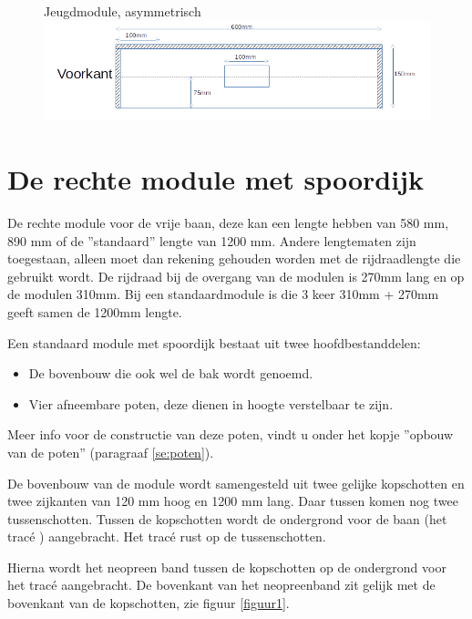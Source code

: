 \documentclass[12pt,a4paper]{report}
\newcommand*{\trace}{trac\'{e} }
\begin{document}
\begin{figure}[!ht]
  \captionbox
  {Jeugdmodule, asymmetrisch\label{im:jeugdbak}}
  {\includegraphics[scale=0.9]{images/jeugdbak}}
\end{figure}

\section{De rechte module met spoordijk}
De rechte module voor de vrije baan, deze kan een lengte hebben van 580 mm, 890 mm of de ''standaard'' lengte van 1200 mm.
Andere lengtematen zijn toegestaan, alleen moet dan rekening gehouden worden met de rijdraadlengte die gebruikt wordt. De rijdraad bij de overgang van de modulen is 270mm lang en op de modulen 310mm.
Bij een standaardmodule is die 3 keer 310mm + 270mm geeft samen de 1200mm lengte.

Een standaard module met spoordijk bestaat uit twee hoofdbestanddelen:
\begin{itemize}
\item De bovenbouw die ook wel de bak wordt genoemd.
\item Vier afneembare poten, deze dienen in hoogte verstelbaar te zijn.
\end{itemize}
Meer info voor de constructie van deze poten, vindt u onder het kopje ''opbouw van de poten'' (paragraaf \ref{se:poten}).

De bovenbouw van de module wordt samengesteld uit twee gelijke kopschotten en twee zijkanten van 120 mm hoog en 1200 mm lang. Daar tussen komen nog twee tussenschotten.
Tussen de kopschotten wordt de ondergrond voor de baan (het \trace) aangebracht. Het \trace rust op de tussenschotten. 

Hierna wordt het neopreen band tussen de kopschotten op de ondergrond voor het \trace aangebracht. De bovenkant van het neopreenband zit gelijk met de bovenkant van de kopschotten, zie figuur \ref{figuur1}.
\end{document}
